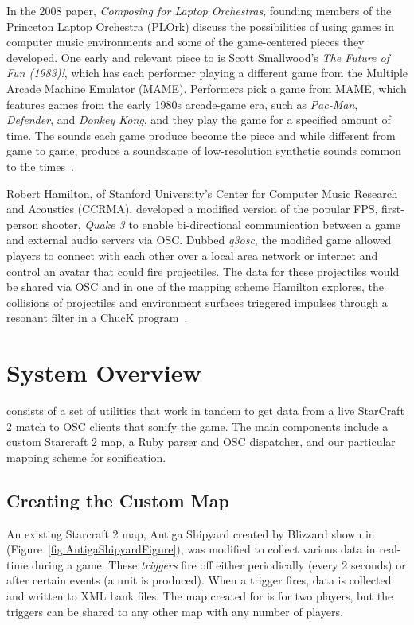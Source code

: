 \documentclass{nime-document-class}
\begin{document}
In the 2008 paper, {\em Composing for Laptop Orchestras}, founding members of the Princeton Laptop Orchestra (PLOrk) discuss the possibilities of using games in computer music environments and some of the game-centered pieces they developed.
One early and relevant piece to \projectName{} is Scott Smallwood's {\em The Future of Fun (1983)!}, which has each performer playing a different game from the Multiple Arcade Machine Emulator (MAME).
Performers pick a game from MAME, which features games from the early 1980s arcade-game era, such as {\em Pac-Man}, {\em Defender}, and {\em Donkey Kong}, and they play the game for a specified amount of time.
The sounds each game produce become the piece and while different from game to game, produce a soundscape of low-resolution synthetic sounds common to the times~\cite{ComposingForLaptopOrchestra:Article}.

Robert Hamilton, of Stanford University's Center for Computer Music Research and Acoustics (CCRMA), developed a modified version of the popular FPS, first-person shooter, {\em Quake 3}  to enable bi-directional communication between a game and external audio servers via OSC.
Dubbed {\em q3osc}, the modified game allowed players to connect with each other over a local area network or internet and control an avatar that could fire projectiles.
The data for these projectiles would be shared via OSC and in one of the mapping scheme Hamilton explores, the collisions of projectiles and environment surfaces triggered impulses through a resonant filter in a ChucK program~\cite{q3osc:Article}. 

\section{System Overview}
\projectName{} consists of a set of utilities that work in tandem to get data from a live StarCraft 2 match to OSC clients that sonify the game.
The main components include a custom Starcraft 2 map, a Ruby parser and OSC dispatcher, and our particular mapping scheme for sonification.

\subsection{Creating the Custom Map}
An existing Starcraft 2 map, Antiga Shipyard created by Blizzard shown in (Figure~\ref{fig:AntigaShipyardFigure}), was modified to collect various data in real-time during a game.
These {\em triggers} fire off either periodically (every 2 seconds) or after certain events (a unit is produced). When a trigger fires, data is collected and written to XML bank files.
The map created for \projectName{} is for two players, but the triggers can be shared to any other map with any number of players. 
\end{document}
